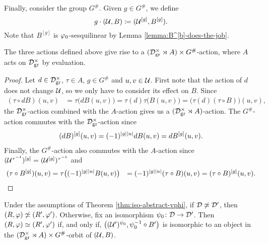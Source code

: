 Finally, consider the group $G^\#$.
Given $g \in G^\#$, we define
\begin{equation}\label{eq:G-action}
	g \cdot (\mathcal U, B) \coloneqq (\mathcal U^{[g]}, B^{[g]}).
\end{equation}
Note that $B^{[g]}$ is $\varphi_0$-sesquilinear by Lemma \ref{lemma:B^[b]-does-the-job}.

\begin{lemma}\label{lemma:action-on-(U,B)}
	The three actions defined above give rise to a $(\mathcal{D}^\times_{\mathrm{gr}} \rtimes A) \times G^\#$-action, where $A$ acts on $\mathcal{D}^\times_{\mathrm{gr}}$ by evaluation.
\end{lemma}

\begin{proof}
	Let $d\in \mathcal{D}^\times_{\mathrm{gr}}$, $\tau \in A$, $g \in G^\#$ and $u, v \in \mathcal U$.
	First note that the action of $d$ does not change $\mathcal U$, so we only have to consider its effect on $B$.
	Since
	\begin{align*}
		(\tau \circ dB)(u,v) & = \tau \big( d B(u,v) \big) = \tau (d) \tau \big( B(u,v) \big) = \big( \tau(d) (\tau \circ B) \big) (u,v),
	\end{align*}
	the $\mathcal{D}^\times_{\mathrm{gr}}$-action combined with the $A$-action gives us a $(\mathcal{D}^\times_{\mathrm{gr}} \rtimes A)$-action.
	The $G^\#$-action commutes with the $\mathcal{D}^\times_{\mathrm{gr}}$-action since
	\begin{align*}
		(dB)^{[g]} (u, v) = (-1)^{|g||u|} dB(u,v) = d B^{[g]}(u,v).
	\end{align*}
	Finally, the $G^\#$-action also commutes with the $A$-action since $(\mathcal U^{\tau^{-1}})^{[g]} = (\mathcal U^{[g]})^{\tau^{-1}}$ and
	\begin{align*}
		(\tau \circ B^{[g]}) (u,v)
		 & = \tau \big( (-1)^{|g||u|} B(u,v) \big)
		 & = (-1)^{|g||u|} (\tau \circ B) (u,v) = (\tau \circ B)^{[g]} (u,v).
	\end{align*}
\end{proof}


\begin{cor}\label{cor:iso-with-actions}
	Under the assumptions of Theorem \ref{thm:iso-abstract-vphi}, if $\mathcal{D} \not \simeq \mathcal{D}'$, then $(R, \varphi) \not \simeq (R', \varphi')$.
	Otherwise, fix an isomorphism $\psi_0\colon \mathcal{D} \to \mathcal{D}'$.
	Then $(R, \varphi) \simeq (R', \varphi')$ if, and only if, $\big( (\mathcal U')^{\psi_0}, \psi_0^{-1} \circ B' \big)$ is isomorphic to an object in the $(\mathcal{D}^\times_{\mathrm{gr}} \rtimes A) \times G^\#$-orbit of $(\mathcal U, B)$.
\end{cor}


